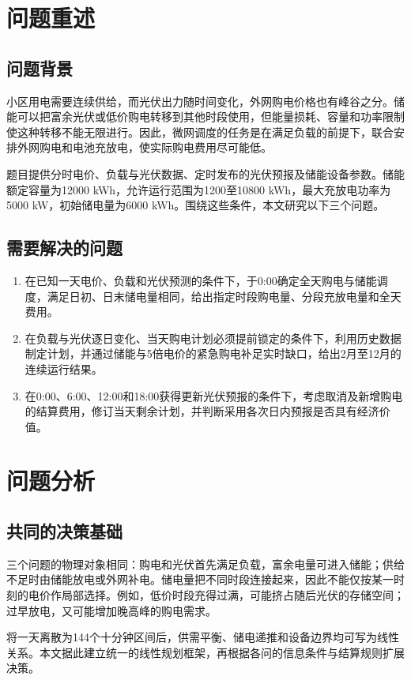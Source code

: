 \section{问题重述}
\subsection{问题背景}
小区用电需要连续供给，而光伏出力随时间变化，外网购电价格也有峰谷之分。储能可以把富余光伏或低价购电转移到其他时段使用，但能量损耗、容量和功率限制使这种转移不能无限进行。因此，微网调度的任务是在满足负载的前提下，联合安排外网购电和电池充放电，使实际购电费用尽可能低。

题目提供分时电价、负载与光伏数据、定时发布的光伏预报及储能设备参数\cite{problem}。储能额定容量为12000 kWh，允许运行范围为1200至10800 kWh，最大充放电功率为5000 kW，初始储电量为6000 kWh。围绕这些条件，本文研究以下三个问题。

\subsection{需要解决的问题}
\begin{enumerate}[label=(\arabic*),leftmargin=2.2em]
\item 在已知一天电价、负载和光伏预测的条件下，于0:00确定全天购电与储能调度，满足日初、日末储电量相同，给出指定时段购电量、分段充放电量和全天费用。
\item 在负载与光伏逐日变化、当天购电计划必须提前锁定的条件下，利用历史数据制定计划，并通过储能与5倍电价的紧急购电补足实时缺口，给出2月至12月的连续运行结果。
\item 在0:00、6:00、12:00和18:00获得更新光伏预报的条件下，考虑取消及新增购电的结算费用，修订当天剩余计划，并判断采用各次日内预报是否具有经济价值。
\end{enumerate}

\section{问题分析}
\subsection{共同的决策基础}
三个问题的物理对象相同：购电和光伏首先满足负载，富余电量可进入储能；供给不足时由储能放电或外网补电。储电量把不同时段连接起来，因此不能仅按某一时刻的电价作局部选择。例如，低价时段充得过满，可能挤占随后光伏的存储空间；过早放电，又可能增加晚高峰的购电需求。

将一天离散为144个十分钟区间后，供需平衡、储电递推和设备边界均可写为线性关系。本文据此建立统一的线性规划框架，再根据各问的信息条件与结算规则扩展决策。


